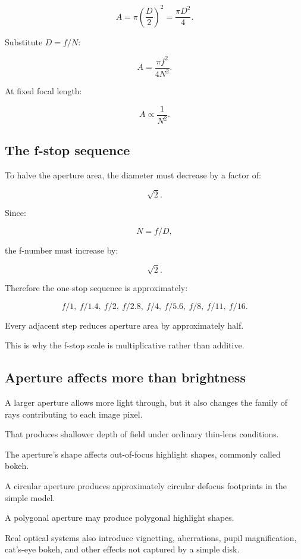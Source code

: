 \[ \boxed{ A=\pi\left(\frac D2\right)^2 =\frac{\pi D^2}{4}. } \]

Substitute \(D=f/N\):

\[ \boxed{ A=\frac{\pi f^2}{4N^2}. } \]

At fixed focal length:

\[ A\propto\frac1{N^2}. \]

\subsection{The f-stop sequence}\label{02-foundations-ii-ch036-the-f-stop-sequence}

To halve the aperture area, the diameter must decrease by a factor of:

\[ \sqrt2. \]

Since:

\[ N=f/D, \]

the f-number must increase by:

\[ \sqrt2. \]

Therefore the one-stop sequence is approximately:

\[ \boxed{ f/1,\ f/1.4,\ f/2,\ f/2.8,\ f/4,\ f/5.6,\ f/8,\ f/11,\ f/16. } \]

Every adjacent step reduces aperture area by approximately half.

This is why the f-stop scale is multiplicative rather than additive.

\subsection{Aperture affects more than brightness}\label{02-foundations-ii-ch036-aperture-affects-more-than-brightness}

A larger aperture allows more light through, but it also changes the family of rays contributing to each image pixel.

That produces shallower depth of field under ordinary thin-lens conditions.

The aperture's shape affects out-of-focus highlight shapes, commonly called bokeh.

A circular aperture produces approximately circular defocus footprints in the simple model.

A polygonal aperture may produce polygonal highlight shapes.

Real optical systems also introduce vignetting, aberrations, pupil magnification, cat's-eye bokeh, and other effects not captured by a simple disk.

